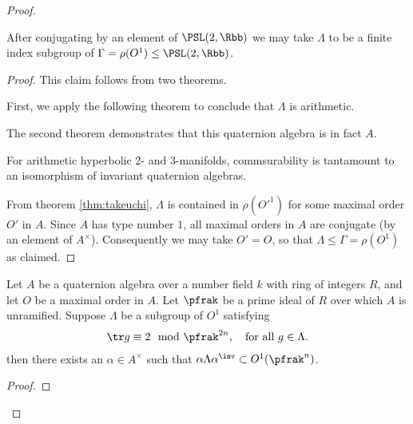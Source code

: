 \begin{proof}
  \begin{claim}
    After conjugating by an element of $\PSL(2,\Rbb)$ we may take $\Lambda$ to be a finite index subgroup of $\Gamma = \rho(O^1) \leq  \PSL(2,\Rbb)$.
  \end{claim}
  \begin{proof}
    This claim follows from two theorems.

    First, we apply the following theorem to conclude that $\Lambda$ is arithmetic.

    The second theorem demonstrates that this quaternion algebra is in fact $A$.

    For arithmetic hyperbolic $2$- and $3$-manifolds, commsurability is tantamount to an isomorphism of invariant quaternion algebras.

    From theorem \ref{thm:takeuchi}, $\Lambda$ is contained in $\rho(O'^1)$ for some maximal order $O'$ in $A$. Since $A$ has type number $1$, all maximal orders in $A$ are conjugate (by an element of $A^\times$). Consequently we may take $O'=O$, so that $\Lambda \leq \Gamma = \rho(O^1)$ as claimed.


  \end{proof}
  \begin{lemma}\label{lemma:MangosteenPicosdeEuropa}
    Let $A$ be a quaternion algebra over a number field $k$ with ring of integers $R$, and let $O$ be a maximal order in $A$.
    Let $\pfrak$ be a prime ideal of $R$ over which $A$ is unramified.
    Suppose $\Lambda$ be a subgroup of $O^1$ satisfying
    \begin{align}\label{eq:trace}
      \tr g \equiv 2 \mod \pfrak^{2n}, \quad \text{for all $g \in \Lambda$}.
    \end{align}
    then there exists an $\alpha \in A^\times$ such that $\alpha \Lambda \alpha^\inv \subset O^1(\pfrak^n)$.
  \end{lemma}
  \begin{proof}



\end{proof}
\end{proof}
